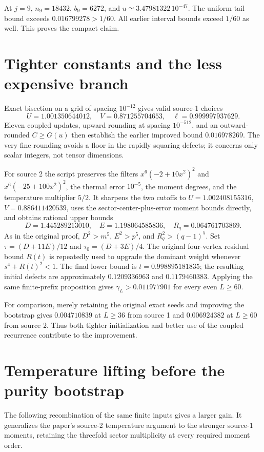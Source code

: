 \documentclass[11pt]{article}
\begin{document}
At $j=9$, $n_9=18432$, $b_9=6272$, and
$u\simeq3.47981322\,10^{-47}$. The uniform tail bound exceeds
$0.016799278>1/60$. All earlier interval bounds exceed $1/60$ as well.
This proves the compact claim.

\section{Tighter constants and the less expensive branch}
Exact bisection on a grid of spacing $10^{-12}$ gives valid source-1 choices
\[
 U=1.001350644012,\quad V=0.871255704653,
 \quad\ell=0.999997937629.
\]
Eleven coupled updates, upward rounding at spacing $10^{-512}$, and an
outward-rounded $C\ge G(u)$ then establish the earlier improved bound
$0.016978269$. The very fine rounding avoids a floor in the rapidly
squaring defects; it concerns only scalar integers, not tensor dimensions.

For source 2 the script preserves the filters $x^6(-2+10x^2)^2$ and
$x^6(-25+100x^2)^2$, the thermal error $10^{-5}$, the moment degrees, and
the temperature multiplier $5/2$. It sharpens the two cutoffs to
$U=1.002408155316$, $V=0.886411420539$, uses the sector-center-plus-error
moment bounds directly, and obtains rational upper bounds
\[
 D=1.445289213010,\quad E=1.198064585836,\quad R_q=0.064761703869.
\]
As in the original proof, $D^2>m^5$, $E^2>p^5$, and
$R_q^2>(q-1)^5$. Set $\tau=(D+11E)/12$ and $\tau_0=(D+3E)/4$.
The original four-vertex residual bound $R(t)$ is repeatedly used to
upgrade the dominant weight whenever $s^4+R(t)^2<1$.
The final lower bound is $t=0.998895181835$; the resulting initial defects
are approximately $0.1209336963$ and $0.1179460383$.
Applying the same finite-prefix proposition gives $\gamma_L>0.011977901$
for every even $L\ge60$.

For comparison, merely retaining the original exact seeds and improving
the bootstrap gives $0.004710839$ at $L\ge36$ from source 1 and
$0.006924382$ at $L\ge60$ from source 2. Thus both tighter initialization
and better use of the coupled recurrence contribute to the improvement.

\section{Temperature lifting before the purity bootstrap}
\label{sec:temperature-lifting}

The following recombination of the same finite inputs gives a larger gain.
It generalizes the paper's source-2 temperature argument to the stronger
source-1 moments, retaining the threefold sector multiplicity at every
required moment order.
\end{document}
